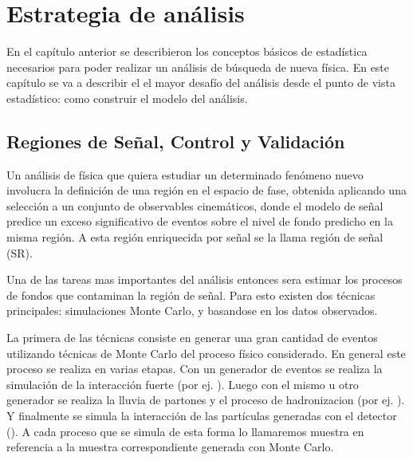 \chapter{Estrategia de análisis}

En el capítulo anterior se describieron los conceptos básicos de
estadística necesarios para poder realizar un análisis de búsqueda
de nueva física.
En este capítulo se va a describir el el mayor
desafío del análisis desde el punto de vista estadístico: como
construir el modelo del análisis.


\section{Regiones de Señal, Control y Validación}

Un análisis de física que quiera estudiar un determinado fenómeno nuevo involucra
la definición de una región en el espacio de fase, obtenida aplicando una selección
a un conjunto de observables cinemáticos, donde el modelo de señal predice un exceso
significativo de eventos sobre el nivel de fondo predicho en la misma región. A esta
región enriquecida por señal se la llama región de señal (SR).

Una de las tareas mas importantes del análisis entonces sera estimar los procesos
de fondos que contaminan la región de señal. Para esto existen dos técnicas principales:
simulaciones Monte Carlo, y basandose en los datos observados.

La primera de las técnicas consiste en generar una gran cantidad de eventos utilizando técnicas
de Monte Carlo del proceso físico considerado. En general este proceso se realiza en varias etapas.
Con un generador de eventos se realiza la simulación de la interacción fuerte (por ej.
{\madgraph}). Luego con el mismo u otro generador se realiza la lluvia de partones y el
proceso de hadronizacion (por ej. {\pythia}). Y finalmente se simula la interacción de las
partículas generadas con el detector ({\geant}). A cada proceso que se simula de esta forma
lo llamaremos muestra en referencia a la muestra correspondiente generada con Monte Carlo.

